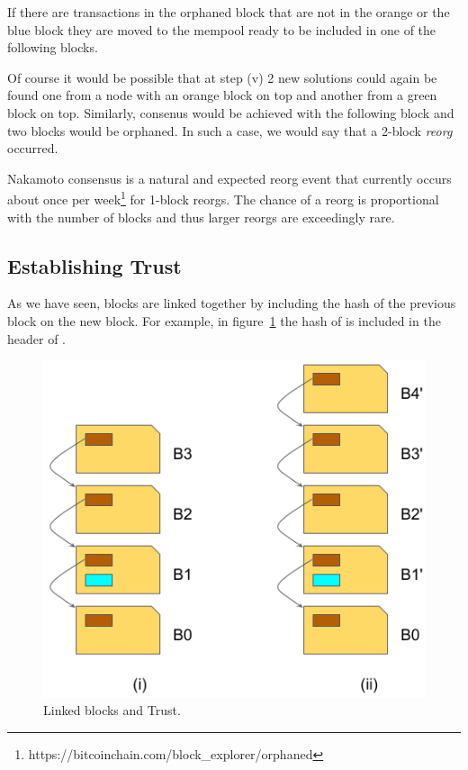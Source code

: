 \vspace{3em}
\begin{note}
If there are transactions in the orphaned block that are not in the orange or the blue block they are moved to the mempool ready to be included in one of the following blocks.
\end{note}

Of course it would be possible that at step (v) 2 new solutions could again be found one from a node with an orange block on top and another from a green block on top. Similarly, consenus would be achieved with the following block and two blocks would be orphaned. In such a case, we would say that a 2-block \emph{reorg} occurred.

Nakamoto consensus is a natural and expected reorg event that currently occurs about once per week\footnote{https://bitcoinchain.com/block\_explorer/orphaned} for 1-block reorgs. The chance of a reorg is proportional with the number of blocks and thus larger reorgs are exceedingly rare.

\subsection*{Establishing Trust}
As we have seen, blocks are linked together by including the hash of the previous block on the new block. For example, in figure~\ref{fig:blockchain-trust} the hash of  is included in the header of .

\begin{figure}[h]
\begin{center}
\includegraphics[scale=0.5]{images/blockchain-trust}
\caption{Linked blocks and Trust.}
\label{fig:blockchain-trust}
\end{center}
\end{figure}

